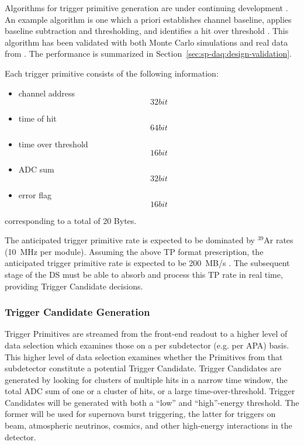 Algorithms for trigger primitive generation are under continuing development
\cite{docid-11275}. An example algorithm is one which a priori establishes
channel baseline, applies baseline subtraction and thresholding, and
identifies a hit over threshold \cite{docid-11236}. This algorithm has been
validated with both Monte Carlo simulations and real data from . The performance is
summarized in Section~\ref{sec:sp-daq:design-validation}.

Each trigger primitive consists of the following information:
\begin{itemize}
\item channel address \[32 bit\]
\item time of hit \[64 bit\]
\item time over threshold \[16 bit\]
\item ADC sum \[32 bit\]
\item error flag \[16 bit\]
\end{itemize}
corresponding to a total of 20 Bytes.

The anticipated trigger primitive rate  is expected to be dominated by
$^{39}$Ar rates (10~MHz per module). Assuming the above TP format
prescription, the anticipated trigger primitive rate is expected to be
200~MB/s . The subsequent stage of the DS must be able to absorb and
process this TP rate in real time, providing Trigger Candidate decisions. 


\subsubsection{Trigger Candidate Generation}

Trigger Primitives are streamed from the front-end  readout to a
higher level of data selection which examines those on a per
subdetector (e.g. per APA) basis. This higher level of data selection examines
whether the Primitives from that subdetector constitute a potential
Trigger Candidate. Trigger Candidates are generated by looking for
clusters of multiple hits in a narrow time window, the total ADC sum of one or a
cluster of hits, or a large time-over-threshold. Trigger 
Candidates will be generated with both a “low” and “high”-energy threshold. The former
will be used for supernova burst triggering, the latter for triggers on beam, atmospheric
neutrinos, cosmics, and other high-energy interactions in the detector. 

